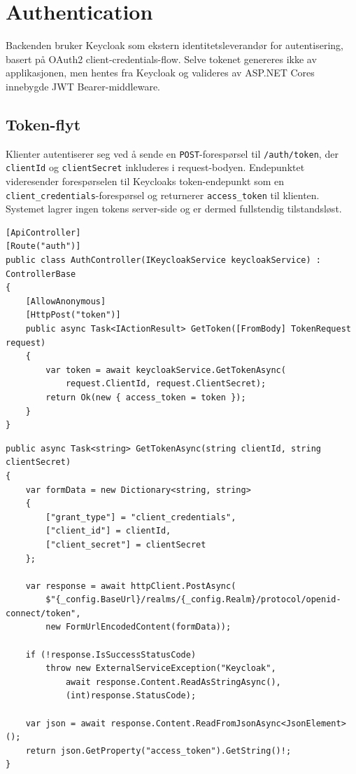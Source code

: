 \section{Authentication}
\label{sec:impl-auth}

Backenden bruker Keycloak som ekstern identitetsleverandør for autentisering, basert på OAuth2 client-credentials-flow. Selve tokenet genereres ikke av applikasjonen, men hentes fra Keycloak og valideres av ASP.NET Cores innebygde JWT Bearer-middleware.

\subsection{Token-flyt}

Klienter autentiserer seg ved å sende en \texttt{POST}-forespørsel til \texttt{/auth/token}, der \texttt{clientId} og \texttt{clientSecret} inkluderes i request-bodyen. Endepunktet videresender forespørselen til Keycloaks token-endepunkt som en \texttt{client\_credentials}-forespørsel og returnerer \texttt{access\_token} til klienten. Systemet lagrer ingen tokens server-side og er dermed fullstendig tilstandsløst.

\begin{lstlisting}[language={[Sharp]C}, caption={AuthController.cs – token-endepunkt}]
[ApiController]
[Route("auth")]
public class AuthController(IKeycloakService keycloakService) : ControllerBase
{
    [AllowAnonymous]
    [HttpPost("token")]
    public async Task<IActionResult> GetToken([FromBody] TokenRequest request)
    {
        var token = await keycloakService.GetTokenAsync(
            request.ClientId, request.ClientSecret);
        return Ok(new { access_token = token });
    }
}
\end{lstlisting}

\begin{lstlisting}[language={[Sharp]C}, caption={KeycloakService.cs – kall mot Keycloak}]
public async Task<string> GetTokenAsync(string clientId, string clientSecret)
{
    var formData = new Dictionary<string, string>
    {
        ["grant_type"] = "client_credentials",
        ["client_id"] = clientId,
        ["client_secret"] = clientSecret
    };

    var response = await httpClient.PostAsync(
        $"{_config.BaseUrl}/realms/{_config.Realm}/protocol/openid-connect/token",
        new FormUrlEncodedContent(formData));

    if (!response.IsSuccessStatusCode)
        throw new ExternalServiceException("Keycloak",
            await response.Content.ReadAsStringAsync(),
            (int)response.StatusCode);

    var json = await response.Content.ReadFromJsonAsync<JsonElement>();
    return json.GetProperty("access_token").GetString()!;
}
\end{lstlisting}

